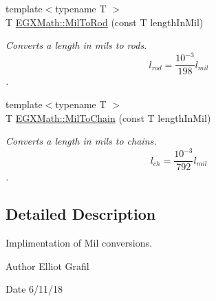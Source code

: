 \begin{DoxyCompactItemize}
{\footnotesize template$<$typename T $>$ }\\T \mbox{\hyperlink{group___e_g_x_math-_conversions-_length_conversions-_imperial-_mil-_surveyors_gae5721b0cf84304ecfade5a7808814329}{E\+G\+X\+Math\+::\+Mil\+To\+Rod}} (const T length\+In\+Mil)
\begin{DoxyCompactList}\small\item\em Converts a length in mils to rods. \[ l_{rod}= \frac{10^{-3}}{198} l_{mil} \]. \end{DoxyCompactList}\item 
{\footnotesize template$<$typename T $>$ }\\T \mbox{\hyperlink{group___e_g_x_math-_conversions-_length_conversions-_imperial-_mil-_surveyors_gac2207a6f05f3d2e7dfec2eade3fdf431}{E\+G\+X\+Math\+::\+Mil\+To\+Chain}} (const T length\+In\+Mil)
\begin{DoxyCompactList}\small\item\em Converts a length in mils to chains. \[ l_{ch}= \frac{10^{-3}}{792} l_{mil} \]. \end{DoxyCompactList}\end{DoxyCompactItemize}


\subsection{Detailed Description}
Implimentation of Mil conversions. 

\begin{DoxyAuthor}{Author}
Elliot Grafil 
\end{DoxyAuthor}
\begin{DoxyDate}{Date}
6/11/18 
\end{DoxyDate}
